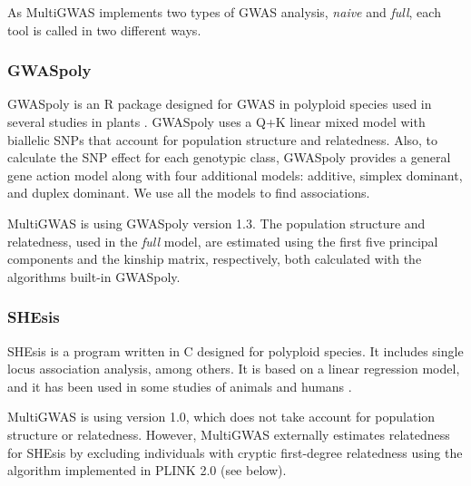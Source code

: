 
As MultiGWAS implements two types of GWAS analysis,  \emph{naive} and  \emph{full}, each tool is called in two different ways.

\subsubsection{GWASpoly}
GWASpoly \cite{Rosyara2016} is an R package designed for GWAS in polyploid species used in several studies in plants \cite{Berdugo2017,Ferrao2018,Sharma2018,Yuan2019}. GWASpoly uses a Q+K linear mixed model with biallelic SNPs that account for population structure and relatedness. Also, to calculate the SNP effect for each genotypic class, GWASpoly provides a general gene action model along with four additional models: additive, simplex dominant, and duplex dominant. We use all the models to find associations. 

MultiGWAS is using GWASpoly version 1.3. The population structure and relatedness, used in the \emph{full} model, are estimated using the first five principal components and the kinship matrix, respectively, both calculated with the algorithms built-in GWASpoly.  

\subsubsection{SHEsis}
SHEsis \cite{Shen2016} is a program written in C designed for polyploid species. It includes single locus association analysis, among others. It is based on a linear regression model, and it has been used in some studies of animals and humans \cite{Qiao2015,Meng2019}. 

MultiGWAS is using version 1.0, which does not take account for population structure or relatedness. However, MultiGWAS externally estimates relatedness for SHEsis by excluding individuals with cryptic first-degree relatedness using the algorithm implemented in PLINK 2.0 (see below).

